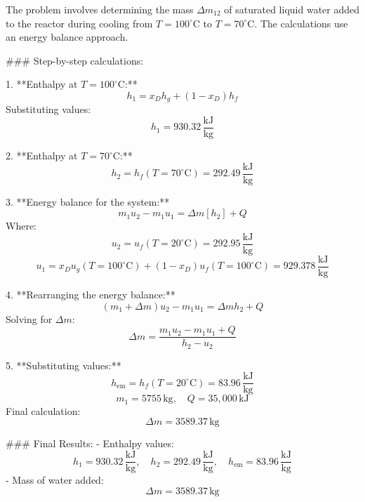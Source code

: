 The problem involves determining the mass \( \Delta m_{12} \) of saturated liquid water added to the reactor during cooling from \( T = 100^\circ\text{C} \) to \( T = 70^\circ\text{C} \). The calculations use an energy balance approach.

### Step-by-step calculations:

1. **Enthalpy at \( T = 100^\circ\text{C} \):**  
   \[
   h_1 = x_D h_g + (1 - x_D) h_f
   \]  
   Substituting values:  
   \[
   h_1 = 930.32 \, \frac{\text{kJ}}{\text{kg}}
   \]

2. **Enthalpy at \( T = 70^\circ\text{C} \):**  
   \[
   h_2 = h_f(T = 70^\circ\text{C}) = 292.49 \, \frac{\text{kJ}}{\text{kg}}
   \]

3. **Energy balance for the system:**  
   \[
   m_1 u_2 - m_1 u_1 = \Delta m \left[ h_2 \right] + Q
   \]  
   Where:  
   \[
   u_2 = u_f(T = 20^\circ\text{C}) = 292.95 \, \frac{\text{kJ}}{\text{kg}}
   \]  
   \[
   u_1 = x_D u_g(T = 100^\circ\text{C}) + (1 - x_D) u_f(T = 100^\circ\text{C}) = 929.378 \, \frac{\text{kJ}}{\text{kg}}
   \]

4. **Rearranging the energy balance:**  
   \[
   (m_1 + \Delta m) u_2 - m_1 u_1 = \Delta m h_2 + Q
   \]  
   Solving for \( \Delta m \):  
   \[
   \Delta m = \frac{m_1 u_2 - m_1 u_1 + Q}{h_2 - u_2}
   \]

5. **Substituting values:**  
   \[
   h_{\text{em}} = h_f(T = 20^\circ\text{C}) = 83.96 \, \frac{\text{kJ}}{\text{kg}}
   \]  
   \[
   m_1 = 5755 \, \text{kg}, \quad Q = 35,000 \, \text{kJ}
   \]  
   Final calculation:  
   \[
   \Delta m = 3589.37 \, \text{kg}
   \]

### Final Results:  
- Enthalpy values:  
  \[
  h_1 = 930.32 \, \frac{\text{kJ}}{\text{kg}}, \quad h_2 = 292.49 \, \frac{\text{kJ}}{\text{kg}}, \quad h_{\text{em}} = 83.96 \, \frac{\text{kJ}}{\text{kg}}
  \]  
- Mass of water added:  
  \[
  \Delta m = 3589.37 \, \text{kg}
  \]